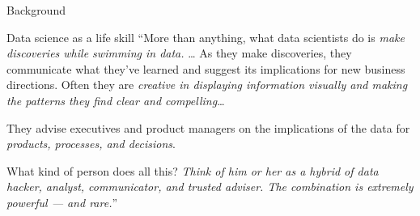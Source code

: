 \documentclass[
  ignorenonframetext,
]{beamer}
\begin{document}
\begin{frame}{Background}
\begin{block}{Data science as a life skill}
\protect\hypertarget{data-science-as-a-life-skill-1}{}
``More than anything, what data scientists do is \emph{make discoveries
while swimming in data.} \ldots{} As they make discoveries, they
communicate what they've learned and suggest its implications for new
business directions. Often they are \emph{creative in displaying
information visually and making the patterns they find clear and
compelling}\ldots{}

They advise executives and product managers on the implications of the
data for \emph{products, processes, and decisions}.

What kind of person does all this? \emph{Think of him or her as a hybrid
of data hacker, analyst, communicator, and trusted adviser. The
combination is extremely powerful --- and rare.}''
\end{block}
\end{frame}
\end{document}
